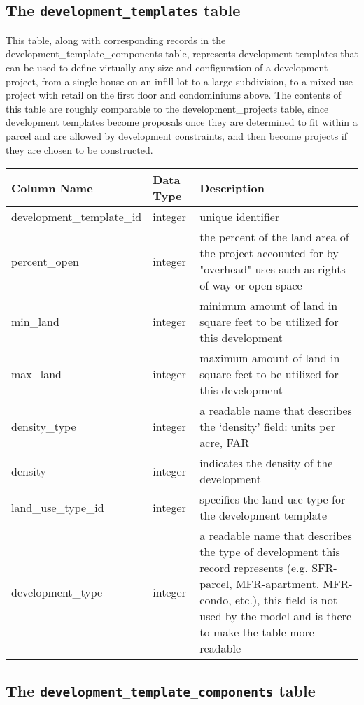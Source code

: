 \subsection{The {\tt development\_templates} table}
\label{sec:db-tables-development-templates}

This table, along with corresponding records in the development\_template\_components table, represents development templates that can be used to define virtually any size and configuration of a development project, from a single house on an infill lot to a large subdivision, to a mixed use project with retail on the first floor and condominiums above. The contents of this table are roughly comparable to the development\_projects table, since development templates become proposals once they are determined to fit within a parcel and are allowed by development constraints, and then become projects if they are chosen to be constructed.

\begin{tabular}{p{2in}lp{3.5in}}
\textbf{Column Name} & \textbf{Data Type} & \textbf{Description} \\
\hline
development\_template\_id & integer & unique identifier\\ \hline
percent\_open & integer & the percent of the land area of the project accounted for by "overhead" uses such as rights of way or open space\\ \hline
min\_land & integer & minimum amount of land in square feet to be utilized for this development\\ \hline
max\_land & integer & maximum amount of land in square feet to be utilized for this development\\ \hline
density\_type & integer & a readable name that describes the `density' field: units per acre, FAR\\ \hline
density & integer & indicates the density of the development\\ \hline
land\_use\_type\_id & integer & specifies the land use type for the development template\\ \hline
development\_type & integer & a readable name that describes the type of development this record represents (e.g. SFR-parcel, MFR-apartment, MFR-condo, etc.), this field is not used by the model and is there to make the table more readable \\ \hline
\end{tabular}

\subsection{The {\tt development\_template\_components} table}
\label{sec:db-tables-development-template-components}

